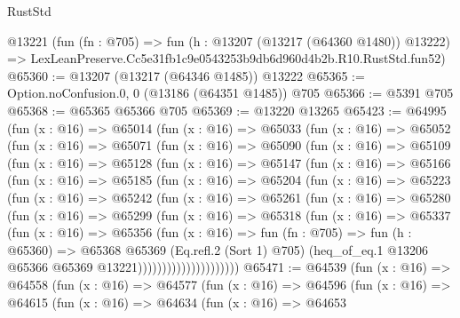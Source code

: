 \begin{lexlean}{RustStd}
\begin{coremodule}
    @13221
    (fun (fn : @705) =>
    fun (h : @13207 (@13217 (@64360 @1480)) @13222) =>
    LexLeanPreserve.Cc5e31fb1c9e0543253b9db6d960d4b2b.R10.RustStd.fun52)
@65360 := @13207 (@13217 (@64346 @1485)) @13222
@65365 := Option.noConfusion.{0, 0} (@13186 (@64351 @1485)) @705
@65366 := @5391 @705
@65368 := @65365 @65366 @705
@65369 := @13220 @13265
@65423 := @64995
    (fun (x : @16) =>
    @65014
      (fun (x : @16) =>
      @65033
        (fun (x : @16) =>
        @65052
          (fun (x : @16) =>
          @65071
            (fun (x : @16) =>
            @65090
              (fun (x : @16) =>
              @65109
                (fun (x : @16) =>
                @65128
                  (fun (x : @16) =>
                  @65147
                    (fun (x : @16) =>
                    @65166
                      (fun (x : @16) =>
                      @65185
                        (fun (x : @16) =>
                        @65204
                          (fun (x : @16) =>
                          @65223
                            (fun (x : @16) =>
                            @65242
                              (fun (x : @16) =>
                              @65261
                                (fun (x : @16) =>
                                @65280
                                  (fun (x : @16) =>
                                  @65299
                                    (fun (x : @16) =>
                                    @65318
                                      (fun (x : @16) =>
                                      @65337
                                        (fun (x : @16) =>
                                        @65356
                                          (fun (x : @16) =>
                                          fun (fn : @705) =>
                                          fun (h : @65360) =>
                                          @65368
                                            @65369
                                            (Eq.refl.{2} (Sort 1) @705)
                                            (heq_of_eq.{1}
                                              @13206
                                              @65366
                                              @65369
                                              @13221)))))))))))))))))))))
@65471 := @64539
    (fun (x : @16) =>
    @64558
      (fun (x : @16) =>
      @64577
        (fun (x : @16) =>
        @64596
          (fun (x : @16) =>
          @64615
            (fun (x : @16) =>
            @64634
              (fun (x : @16) =>
              @64653

\end{coremodule}
\end{lexlean}
